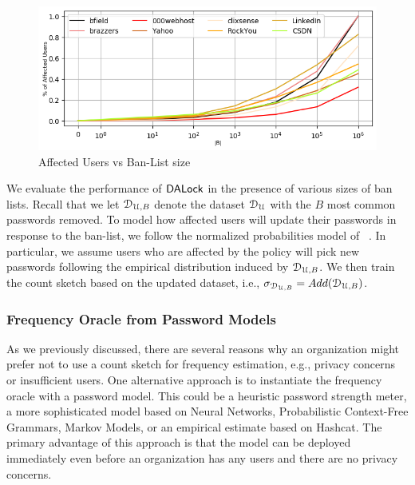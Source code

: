 \begin{figure}[htb]	
	\begin{center}
		\vspace{-0.4cm}
		\includegraphics[width=\linewidth]{Figures/Experiments/AffectedUsers}
		\vspace{-0.4cm}
		\caption{Affected Users vs Ban-List size}\label{figure: affectedusers}
		\vspace{-0.45cm}
	\end{center}
\end{figure}
\vspace*{-\baselineskip}
We evaluate the performance of $\mathsf{DALock}$ in the presence of various sizes of ban lists. Recall that we let $\mathcal{D}_{{\mathcal{U}, B}}$ denote the dataset $\mathcal{D}_{{\mathcal{U}}}$ with the $B$ most common passwords removed. To model how affected users will update their passwords in response to the ban-list, we follow the normalized probabilities model of ~\cite{BKPS:ACMEC13}. In particular, we assume users who are affected by the policy will pick new passwords following the empirical distribution induced by $\mathcal{D}_{{\mathcal{U}, B}}$. We then train the count sketch based on the updated dataset, i.e., $\sigma_{\mathcal{D}_{{\mathcal{U}, B}}} = Add(\mathcal{D}_{{\mathcal{U}, B}})$.



\vspace*{-\baselineskip}
\subsubsection{Frequency Oracle from Password Models}
\vspace*{-\baselineskip}

As we previously discussed, there are several reasons why an organization might prefer not to use a count sketch for frequency estimation, e.g., privacy concerns or insufficient users. One alternative approach is to instantiate the frequency oracle with a password model. This could be a heuristic password strength meter, a more sophisticated model based on Neural Networks, Probabilistic Context-Free Grammars,  Markov Models, or an empirical estimate based on Hashcat. The primary advantage of this approach is that the model can be deployed immediately even before an organization has any users and there are no privacy concerns. 


